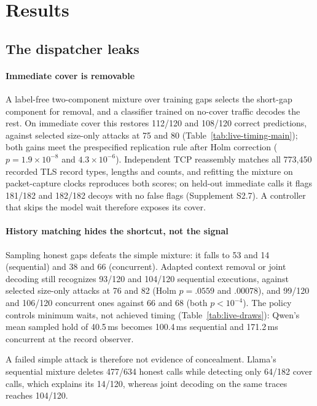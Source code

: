 \section{Results}\label{sec:results}
\subsection{The dispatcher leaks}\label{sec:dispatch}


\paragraph{Immediate cover is removable}
A label-free two-component mixture over training gaps selects the short-gap component for removal, and a classifier trained on no-cover traffic decodes the rest. On immediate cover this restores 112/120 and 108/120 correct predictions, against selected size-only attacks at 75 and 80 (Table~\ref{tab:live-timing-main}); both gains meet the prespecified replication rule after Holm correction ($p=1.9\times10^{-8}$ and $4.3\times10^{-6}$). Independent TCP reassembly matches all 773,450 recorded TLS record types, lengths and counts, and refitting the mixture on packet-capture clocks reproduces both scores; on held-out immediate calls it flags 181/182 and 182/182 decoys with no false flags (Supplement S2.7). A controller that skips the model wait therefore exposes its cover.

\paragraph{History matching hides the shortcut, not the signal}
Sampling honest gaps defeats the simple mixture: it falls to 53 and 14 (sequential) and 38 and 66 (concurrent). Adapted context removal or joint decoding still recognizes 93/120 and 104/120 sequential executions, against selected size-only attacks at 76 and 82 (Holm $p=.0559$ and $.00078$), and 99/120 and 106/120 concurrent ones against 66 and 68 (both $p<10^{-4}$). The policy controls minimum waits, not achieved timing (Table~\ref{tab:live-draws}): Qwen's mean sampled hold of 40.5\,ms becomes 100.4\,ms sequential and 171.2\,ms concurrent at the record observer.


 A failed simple attack is therefore not evidence of concealment. Llama's sequential mixture deletes 477/634 honest calls while detecting only 64/182 cover calls, which explains its 14/120, whereas joint decoding on the same traces reaches 104/120.

